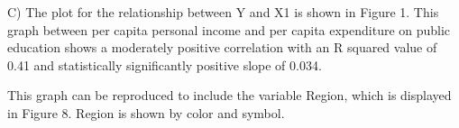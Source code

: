 \documentclass[12pt,letterpaper]{article}
\begin{document}
\vspace{.5cm}

  

\vspace{.5cm}

\noindent C) The plot for the relationship between Y and X1 is shown in Figure 1. This graph between per capita personal income and per capita expenditure on public education shows a moderately positive correlation with an R squared value of 0.41 and statistically significantly positive slope of 0.034.

\vspace{.5cm}

\noindent This graph can be reproduced to include the variable Region, which is displayed in Figure 8. Region is shown by color and symbol.

\vspace{.5cm}

 

\vspace{.5cm}

 

\vspace{.5cm}

 

\vspace{.5cm}
\end{document}

